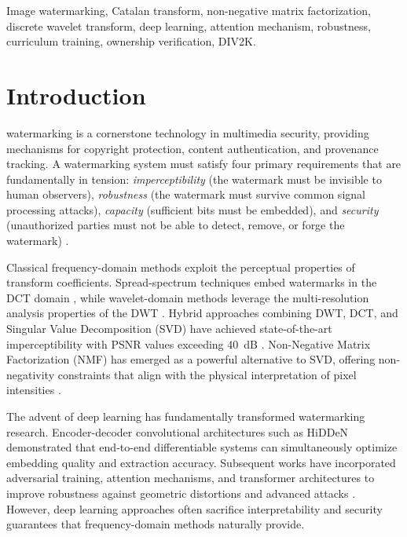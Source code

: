 \documentclass[journal]{IEEEtran}
\begin{document}
\begin{IEEEkeywords}
Image watermarking, Catalan transform, non-negative matrix factorization,
discrete wavelet transform, deep learning, attention mechanism, robustness,
curriculum training, ownership verification, DIV2K.
\end{IEEEkeywords}

\IEEEpeerreviewmaketitle

\section{Introduction}

 watermarking is a cornerstone technology in
multimedia security, providing mechanisms for copyright protection,
content authentication, and provenance tracking. A watermarking system
must satisfy four primary requirements that are fundamentally in tension:
\emph{imperceptibility} (the watermark must be invisible to human
observers), \emph{robustness} (the watermark must survive common signal
processing attacks), \emph{capacity} (sufficient bits must be embedded),
and \emph{security} (unauthorized parties must not be able to detect,
remove, or forge the watermark) \cite{cox1997secure}.

Classical frequency-domain methods exploit the perceptual properties of
transform coefficients. Spread-spectrum techniques embed watermarks in
the DCT domain \cite{cox1997secure}, while wavelet-domain methods
leverage the multi-resolution analysis properties of the DWT
\cite{barni1998dct}. Hybrid approaches combining DWT, DCT, and Singular
Value Decomposition (SVD) have achieved state-of-the-art imperceptibility
with PSNR values exceeding 40~dB \cite{makbol2013robust,parah2016hiding}.
Non-Negative Matrix Factorization (NMF) has emerged as a powerful
alternative to SVD, offering non-negativity constraints that align with
the physical interpretation of pixel intensities \cite{hamidi2018hybrid}.

The advent of deep learning has fundamentally transformed watermarking
research. Encoder-decoder convolutional architectures such as HiDDeN
\cite{zhu2018hidden} demonstrated that end-to-end differentiable systems
can simultaneously optimize embedding quality and extraction accuracy.
Subsequent works have incorporated adversarial training, attention
mechanisms, and transformer architectures to improve robustness against
geometric distortions and advanced attacks \cite{zhang2022robust}.
However, deep learning approaches often sacrifice interpretability and
security guarantees that frequency-domain methods naturally provide.
\end{document}
